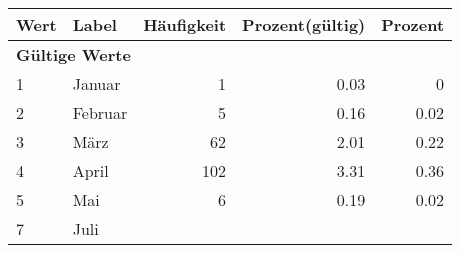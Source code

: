      \begin{longtable}{lXrrr}
     \toprule
     \textbf{Wert} & \textbf{Label} & \textbf{Häufigkeit} & \textbf{Prozent(gültig)} & \textbf{Prozent} \\
     \endhead
     \midrule
     \multicolumn{5}{l}{\textbf{Gültige Werte}}\\

     1 &
     \multicolumn{1}{X}{ Januar   } &


       \num{1} &
       \num[round-mode=places,round-precision=2]{0,03} &
         \num[round-mode=places,round-precision=2]{0} \\

     2 &
     \multicolumn{1}{X}{ Februar   } &


       \num{5} &
       \num[round-mode=places,round-precision=2]{0,16} &
         \num[round-mode=places,round-precision=2]{0,02} \\

     3 &
     \multicolumn{1}{X}{ März   } &


       \num{62} &
       \num[round-mode=places,round-precision=2]{2,01} &
         \num[round-mode=places,round-precision=2]{0,22} \\

     4 &
     \multicolumn{1}{X}{ April   } &


       \num{102} &
       \num[round-mode=places,round-precision=2]{3,31} &
         \num[round-mode=places,round-precision=2]{0,36} \\

     5 &
     \multicolumn{1}{X}{ Mai   } &


       \num{6} &
       \num[round-mode=places,round-precision=2]{0,19} &
         \num[round-mode=places,round-precision=2]{0,02} \\

     7 &
     \multicolumn{1}{X}{ Juli   } &



\end{longtable}
